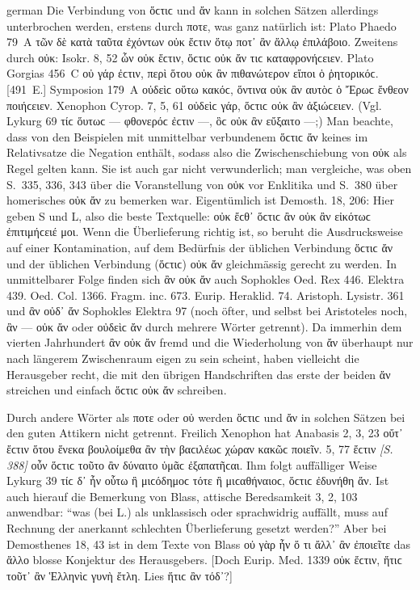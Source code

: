 \begin{otherlanguage*}{german}
Die Verbindung von ὅϲτιϲ und ἄν kann in solchen Sätzen allerdings unterbrochen werden, erstens durch ποτε, was ganz natürlich ist: Plato Phaedo 79~A τῶν δὲ κατὰ ταῦτα ἐχόντων οὐκ ἔϲτιν ὅτῳ ποτ᾽ ἂν ἄλλῳ ἐπιλάβοιο. Zweitens durch οὐκ: Isokr. 8, 52 ὧν οὐκ ἔϲτιν, ὅϲτιϲ οὐκ ἄν τιϲ καταφρονήϲειεν. Plato Gorgias 456~C οὐ γάρ ἐϲτιν, περὶ ὅτου οὐκ ἂν πιθανώτερον εἴποι ὁ ῥητορικόϲ. [491~Ε.] Symposion 179~Α οὐδεὶϲ οὕτω κακόϲ, ὅντινα οὐκ ἂν αυτὸϲ ὁ Ἔρωϲ ἔνθεον ποιήϲειεν. Xenophon Cyrop. 7, 5, 61 οὐδεὶϲ γάρ, ὅϲτιϲ οὐκ ἂν ἀξιώϲειεν. (Vgl. Lykurg 69 τίϲ ὅυτωϲ — φθονερόϲ ἐϲτιν —, ὃϲ οὐκ ἂν εὔξαιτο —;) Man beachte, dass von den Beispielen mit unmittelbar verbundenem ὅϲτιϲ ἄν keines im Relativsatze die Negation enthält, sodass also die Zwischenschiebung von οὐκ als Regel gelten kann. Sie ist auch gar nicht verwunderlich; man vergleiche, was oben S.~335, 336, 343 über die Voranstellung von οὐκ vor Enklitika und S.~380 über homerisches οὐκ ἄν zu bemerken war. Eigentümlich ist Demosth. 18, 206: Hier geben S und L, also die beste Textquelle: οὐκ ἔϲθ᾽ ὅϲτιϲ ἂν οὐκ ἂν εἰκότωϲ ἐπιτιμήϲειέ μοι. Wenn die Überlieferung richtig ist, so beruht die Ausdrucksweise auf einer Kontamination, auf dem Bedürfnis der üblichen Verbindung ὅϲτιϲ ἄν und der üblichen Verbindung (ὅϲτιϲ) οὐκ ἄν gleichmässig gerecht zu werden. In unmittelbarer Folge finden sich ἂν οὐκ ἄν auch Sophokles Oed. Rex 446. Elektra 439. Oed. Col. 1366. Fragm. inc. 673. Eurip. Heraklid. 74. Aristoph. Lysistr. 361 und ἂν οὐδ᾽ ἄν Sophokles Elektra 97 (noch öfter, und selbst bei Aristoteles noch, ἂν — οὐκ ἄν oder οὐδεὶϲ ἄν durch mehrere Wörter getrennt). Da immerhin dem vierten Jahrhundert ἂν οὐκ ἄν fremd und die Wiederholung von ἄν überhaupt nur nach längerem Zwischenraum eigen zu sein scheint, haben vielleicht die Herausgeber recht, die mit den übrigen Handschriften das erste der beiden ἄν streichen und einfach ὅϲτιϲ οὐκ ἄν schreiben.

Durch andere Wörter als ποτε oder οὐ werden ὅϲτιϲ und ἄν in solchen Sätzen bei den guten Attikern nicht getrennt. Freilich Xenophon hat Anabasis 2, 3, 23 οὔτ᾽ ἔϲτιν ὅτου ἕνεκα βουλοίμεθα ἂν τὴν βαϲιλέωϲ χώραν κακῶϲ ποιεῖν. 5, 77 ἔϲτιν \hypertarget{p388}{\emph{[S. 388]}}\label{p388} οὖν ὅϲτιϲ τοῦτο ἂν δύναιτο ὑμᾶϲ ἐξαπατῆϲαι. Ihm folgt auffälliger Weise Lykurg 39 τίϲ δ᾽ ἦν οὗτω ἢ μιϲόδημοϲ τότε ἢ μιϲαθήναιοϲ, ὅϲτιϲ ἐδυνήθη ἄν. Ist auch hierauf die Bemerkung von Blass, attische Beredsamkeit 3, 2, 103 anwendbar: “was (bei L.) als unklassisch oder sprachwidrig auffällt, muss auf Rechnung der anerkannt schlechten Überlieferung gesetzt werden?” Aber bei Demosthenes 18, 43 ist in dem Texte von Blass οὐ γὰρ ἦν ὅ τι ἄλλ᾽ ἂν ἐποιεῖτε das ἄλλο blosse Konjektur des Herausgebers. [Doch Eurip. Med. 1339 οὐκ ἔϲτιν, ἥτιϲ τοῦτ᾽ ἂν Ἑλληνὶϲ γυνὴ ἔτλη. Lies ἥτιϲ ἂν τόδ᾽?]


\end{otherlanguage*}
